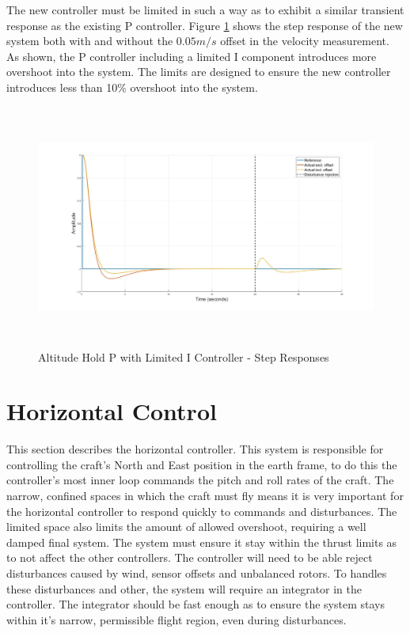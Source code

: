 		 The new controller must be limited in such a way as to exhibit a similar transient response as the existing P controller. Figure \ref{IM_AltHoldPIDistStep} shows the step response of the new system both with and without the $0.05m/s$ offset in the velocity measurement. As shown, the P controller including a limited I component introduces more overshoot into the system. The limits are designed to ensure the new controller introduces less than 10\% overshoot into the system. 
		 
		 \begin{figure}[H]
		 	\centering
		 	\includegraphics[height = 8cm]{../Design/Matlab/Controllers/altitude_step_pi.jpg}
		 	\caption{Altitude Hold P with Limited I Controller -  Step Responses}
		 	\label{IM_AltHoldPIDistStep}
		 \end{figure}
	 
\section{Horizontal Control}
This section describes the horizontal controller. This system is responsible for controlling the craft's North and East position in the earth frame, to do this the controller's most inner loop commands the pitch and roll rates of the craft. The narrow, confined spaces in which the craft must fly means it is very important for the horizontal controller to respond quickly to commands and disturbances. The limited space also limits the amount of allowed overshoot, requiring a well damped final system. The system must ensure it stay within the thrust limits as to not affect the other controllers. The controller will need to be able reject disturbances caused by wind, sensor offsets and unbalanced rotors. To handles these disturbances and other, the system will require an integrator in the controller. The integrator should be fast enough as to ensure the system stays within it's narrow, permissible flight region, even during disturbances.

